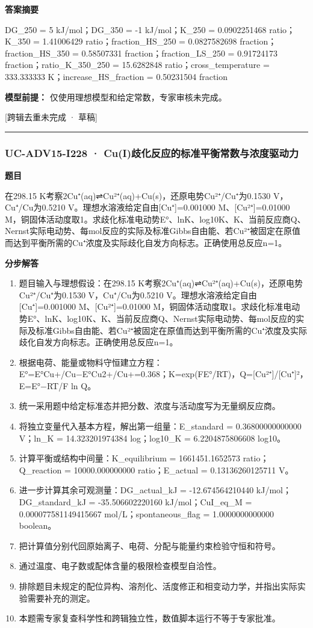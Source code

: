 \documentclass[UTF8,11pt,a4paper]{ctexart}
\begin{document}
\noindent\textbf{答案摘要}\par
DG\_250 = 5 kJ/mol；DG\_350 = -1 kJ/mol；K\_250 = 0.0902251468 ratio；K\_350 = 1.41006429 ratio；fraction\_HS\_250 = 0.0827582698 fraction；fraction\_HS\_350 = 0.58507331 fraction；fraction\_LS\_250 = 0.91724173 fraction；ratio\_K\_350\_250 = 15.6282848 ratio；cross\_temperature = 333.333333 K；increase\_HS\_fraction = 0.50231504 fraction\par
\noindent\textbf{模型前提：}
仅使用理想模型和给定常数，专家审核未完成。\par
\noindent\textcolor{red!65!black}{[跨辑去重未完成 · 草稿]} \par
\medskip\hrule\medskip
{}
\subsubsection*{UC-ADV15-I228 · Cu(I)歧化反应的标准平衡常数与浓度驱动力}
\noindent\textbf{题目}\par
在298.15 K考察2Cu⁺(aq)⇌Cu²⁺(aq)+Cu(s)，还原电势Cu²⁺/Cu⁺为0.1530 V，Cu⁺/Cu为0.5210 V。理想水溶液给定自由[Cu⁺]=0.001000 M、[Cu²⁺]=0.01000 M，铜固体活动度取1。求歧化标准电动势E°、lnK、log10K、K、当前反应商Q、Nernst实际电动势、每mol反应的实际及标准Gibbs自由能、若Cu²⁺被固定在原值而达到平衡所需的Cu⁺浓度及实际歧化自发方向标志。正确使用总反应n=1。\par
\medskip\noindent\textbf{分步解答}
\begin{enumerate}
\item 题目输入与理想假设：在298.15 K考察2Cu⁺(aq)⇌Cu²⁺(aq)+Cu(s)，还原电势Cu²⁺/Cu⁺为0.1530 V，Cu⁺/Cu为0.5210 V。理想水溶液给定自由[Cu⁺]=0.001000 M、[Cu²⁺]=0.01000 M，铜固体活动度取1。求歧化标准电动势E°、lnK、log10K、K、当前反应商Q、Nernst实际电动势、每mol反应的实际及标准Gibbs自由能、若Cu²⁺被固定在原值而达到平衡所需的Cu⁺浓度及实际歧化自发方向标志。正确使用总反应n=1。
\item 根据电荷、能量或物料守恒建立方程：E°=E°Cu+/Cu−E°Cu2+/Cu+=0.368；K=exp(FE°/RT)，Q=[Cu²⁺]/[Cu⁺]²，E=E°−RT/F ln Q。
\item 统一采用题中给定标准态并把分数、浓度与活动度写为无量纲反应商。
\item 将独立变量代入基本方程，解出第一组量：E\_standard = 0.36800000000000 V；ln\_K = 14.323201974384 log；log10\_K = 6.2204875806608 log10。
\item 计算平衡或结构中间量：K\_equilibrium = 1661451.1652573 ratio；Q\_reaction = 10000.000000000 ratio；E\_actual = 0.13136260125711 V。
\item 进一步计算其余可观测量：DG\_actual\_kJ = -12.674564210440 kJ/mol；DG\_standard\_kJ = -35.506602220160 kJ/mol；CuI\_eq\_M = 0.000077581149415667 mol/L；spontaneous\_flag = 1.0000000000000 boolean。
\item 把计算值分别代回原始离子、电荷、分配与能量约束检验守恒和符号。
\item 通过温度、电子数或配体含量的极限检查模型自洽性。
\item 排除题目未规定的配位异构、溶剂化、活度修正和相变动力学，并指出实际实验需要补充的测定。
\item 本题需专家复查科学性和跨辑独立性，数值脚本运行不等于专家批准。
\end{enumerate}
\end{document}

